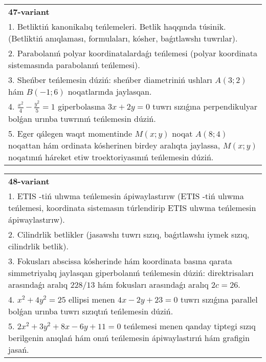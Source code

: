 \documentclass{article}
\begin{document}
\begin{tabular}{m{17cm}}
\textbf{47-variant}\\
1. Betliktiń kanonikalıq teńlemeleri. Betlik haqqında túsinik. (Betliktiń anıqlaması, formulaları, kósher, baǵıtlawshı tuwrılar).\\

2. Parabolanıń polyar koordinatalardaǵı teńlemesi (polyar koordinata sistemasında parabolanıń teńlemesi).\\

3. Sheńber teńlemesin dúziń: sheńber diametriniń ushları $A (3;2) $ hám $B (-1;6 ) $ noqatlarında jaylasqan.\\

4. $\frac{x^{2}}{4} - \frac{y^{2}}{5} = 1$ giperbolasına $3x + 2y = 0$ tuwrı sızıǵına perpendikulyar bolǵan urınba tuwrınıń teńlemesin dúziń.\\

5. Eger qálegen waqıt momentinde $M(x;y)$ noqat $A(8;4)$ noqattan hám ordinata kósherinen birdey aralıqta jaylassa, $M(x;y)$ noqatınıń háreket etiw troektoriyasınıń teńlemesin dúziń.  
\end{tabular}
\vspace{1cm}


\begin{tabular}{m{17cm}}
\textbf{48-variant}\\
1. ETIS -tiń ulıwma teńlemesin ápiwaylastırıw (ETIS -tiń ulıwma teńlemesi, koordinata sistemasın túrlendirip ETIS ulıwma teńlemesin ápiwaylastırıw).\\

2. Cilindrlik betlikler (jasawshı tuwrı sızıq, baǵıtlawshı iymek sızıq, cilindrlik betlik).\\

3. Fokusları abscissa kósherinde hám koordinata basına qarata simmetriyalıq jaylasqan giperbolanıń teńlemesin dúziń: direktrisaları arasındaǵı aralıq $228/13$ hám fokusları arasındaǵı aralıq $2 c=26$.\\

4. $x^{2} + 4y^{2} = 25$ ellipsi menen $4x - 2y + 23 = 0$ tuwrı sızıǵına parallel bolǵan urınba tuwrı sızıqtıń teńlemesin dúziń.  \\

5. $2x^{2} + 3y^{2} + 8x - 6y + 11 = 0$ teńlemesi menen qanday tiptegi sızıq berilgenin anıqlań hám onıń teńlemesin ápiwaylastırıń hám grafigin jasań.  
\end{tabular}
\vspace{1cm}
\end{document}
